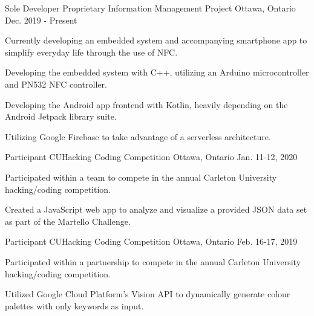 

\begin{cventries}

  \cventry
    {Sole Developer} %
    {Proprietary Information Management Project} %
    {Ottawa, Ontario} %
    {Dec. 2019 - Present} %
    {
      \begin{cvitems} %
      \item {Currently developing an embedded system and accompanying smartphone app to simplify everyday life through the use of NFC.}
      \item {Developing the embedded system with C++, utilizing an Arduino microcontroller and PN532 NFC controller.}
      \item {Developing the Android app frontend with Kotlin, heavily depending on the Android Jetpack library suite.}
      \item {Utilizing Google Firebase to take advantage of a serverless architecture.}
      \end{cvitems}
    }

  \cventry
    {Participant} %
    {CUHacking Coding Competition} %
    {Ottawa, Ontario} %
    {Jan. 11-12, 2020} %
    {
      \begin{cvitems} %
      \item {Participated within a team to compete in the annual Carleton University hacking/coding competition.}
      \item {Created a JavaScript web app to analyze and visualize a provided JSON data set as part of the Martello Challenge.}
      \end{cvitems}
    }

  \cventry
    {Participant} %
    {CUHacking Coding Competition} %
    {Ottawa, Ontario} %
    {Feb. 16-17, 2019} %
    {
      \begin{cvitems} %
      \item {Participated within a partnership to compete in the annual Carleton University hacking/coding competition.}
      \item {Utilized Google Cloud Platform's Vision API to dynamically generate colour palettes with only keywords as input.}
      \end{cvitems}
    }


\end{cventries}
